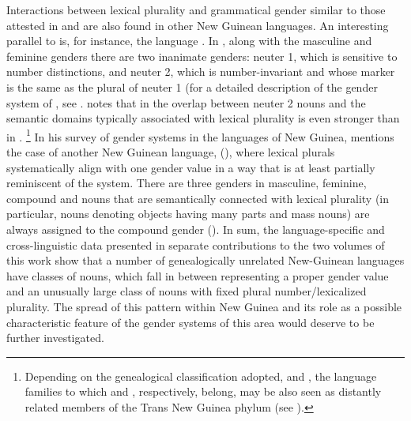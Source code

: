 \documentclass[output=collectionpaper]{langsci/langscibook}
\begin{document}
Interactions between lexical plurality and grammatical gender similar to those attested in  and  are also found in other New Guinean languages. An interesting parallel to  is, for instance, the  language . In , along with the masculine and feminine genders there are two inanimate genders: neuter 1, which is sensitive to number distinctions, and neuter 2, which is number-invariant and whose marker is the same as the plural of neuter 1 (for a detailed description of the gender system of , see \cite{Fedden2011}.  notes that in  the overlap between neuter 2 nouns and the semantic domains typically associated with lexical plurality is even stronger than in .%
\footnote{%
Depending on the genealogical classification adopted,  and , the language families to which  and , respectively, belong, may be also seen as distantly related members of the Trans New Guinea phylum (see ).
} %
In his survey of gender systems in the languages of New Guinea,  mentions the case of another New Guinean language,  (), where lexical plurals systematically align with one gender value in a way that is at least partially reminiscent of the  system. There are three genders in  \textendash{} masculine, feminine, compound \textendash{} and nouns that are semantically connected with lexical plurality (in particular, nouns denoting objects having many parts and mass nouns) are always assigned to the compound gender (\citealt[68]{Arsjoe1999}). In sum, the language-specific and cross-linguistic data presented in separate contributions to the two volumes of this work show that a number of genealogically unrelated New-Guinean languages have classes of nouns, which fall in between representing a proper gender value and an unusually large class of nouns with fixed plural number/lexicalized plurality. The spread of this pattern within New Guinea and its role as a possible characteristic feature of the gender systems of this area would deserve to be further investigated.
\end{document}
